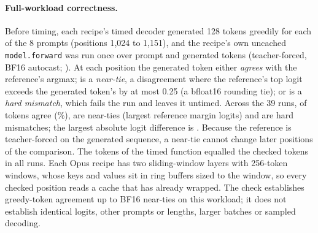 \documentclass{article}
\begin{document}
\paragraph{Full-workload correctness.} Before timing, each recipe's timed decoder generated 128 tokens greedily for each of the 8 prompts (positions 1,024 to 1,151), and the recipe's own uncached \texttt{model.forward} was run once over prompt and generated tokens (teacher-forced, BF16 autocast; ). At each position the generated token either \emph{agrees} with the reference's argmax; is a \emph{near-tie}, a disagreement where the reference's top logit exceeds the generated token's by at most 0.25 (a bfloat16 rounding tie); or is a \emph{hard mismatch}, which fails the run and leaves it untimed. Across the 39 runs, \CRSixTokensAgree{} of \CRSixTokensChecked{} tokens agree (\CRSixAgreePct\%), \CRSixNearTies{} are near-ties (largest reference margin \CRSixNearTieMaxDeficit{} logits) and \CRSixHardMismatches{} are hard mismatches; the largest absolute logit difference is \CRSixMaxLogitErr. Because the reference is teacher-forced on the generated sequence, a near-tie cannot change later positions of the comparison. The tokens of the timed function equalled the checked tokens in all \CRSixTimedEqual{} runs. Each Opus recipe has two sliding-window layers with 256-token windows, whose keys and values sit in ring buffers sized to the window, so every checked position reads a cache that has already wrapped. The check establishes greedy-token agreement up to BF16 near-ties on this workload; it does not establish identical logits, other prompts or lengths, larger batches or sampled decoding.
\end{document}
